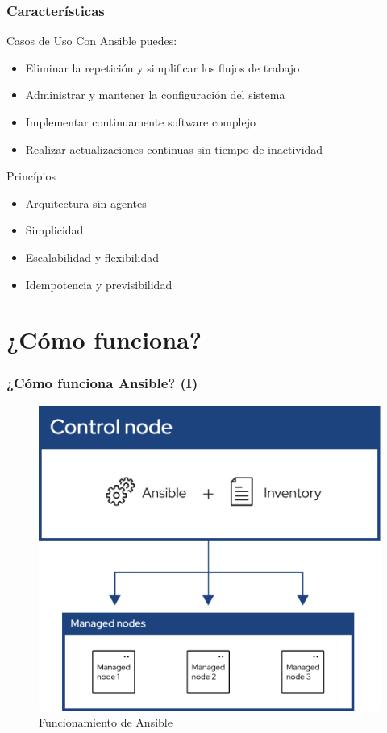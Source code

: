 \documentclass[
	11pt, %
]{beamer}
\begin{document}

\begin{frame}
	\frametitle{Características}

	\begin{exampleblock}{Casos de Uso}
		Con Ansible puedes:
		\begin{itemize}
			\item Eliminar la repetición y simplificar los flujos de trabajo
			\item Administrar y mantener la configuración del sistema
			\item Implementar continuamente software complejo
			\item Realizar actualizaciones continuas sin tiempo de inactividad
		\end{itemize}
	\end{exampleblock}

	\begin{exampleblock}{Princípios}
		\begin{itemize}
			\item Arquitectura sin agentes
			\item Simplicidad
			\item Escalabilidad y flexibilidad
			\item Idempotencia y previsibilidad
		\end{itemize}
	\end{exampleblock}

\end{frame}

\section{¿Cómo funciona?}

\begin{frame}
	\frametitle{¿Cómo funciona Ansible? (I)}

	\begin{figure}
		\includegraphics[width=0.65\linewidth]{ansible_inv_start.pdf}
		\caption{Funcionamiento de Ansible}
	\end{figure}

\end{frame}
\end{document}
